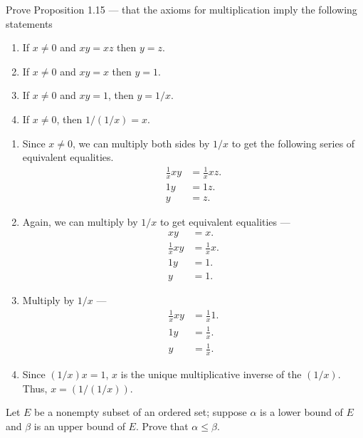 \documentclass[12 pt, letterpaper]{hmcpset}
\begin{document}
\pagebreak

\begin{problem}[3.]
	Prove Proposition 1.15 --- that the axioms for multiplication imply the following statements
	\begin{enumerate}
		\item If $x \neq 0$ and $xy = xz$ then $y = z$.
		\item If $x \neq 0$ and $xy = x$ then $y = 1$.
		\item If $x \neq 0$ and $xy = 1$, then $y = 1/x$.
		\item If $x \neq 0$, then $1/(1/x) = x$.
	\end{enumerate}
\end{problem}

\begin{solution}
	\begin{enumerate}
		\item Since $x \neq 0$, we can multiply both sides by $1/x$ to get the following series of equivalent equalities.
			\[
				\begin{split}
					\frac{1}{x} xy & = \frac{1}{x} xz. \\
					1y & = 1z. \\
					y & = z.
				\end{split}
			\]
		\item Again, we can multiply by $1/x$ to get equivalent equalities ---
			\[
				\begin{split}
					xy & = x. \\
					\frac{1}{x} xy & = \frac{1}{x} x. \\
					1 y & = 1. \\
					y & = 1.
				\end{split}
			\]
		\item Multiply by $1/x$ ---
			\[
				\begin{split}
					\frac{1}{x} xy & = \frac{1}{x} 1. \\
					1 y & = \frac{1}{x}. \\
					y & = \frac{1}{x}.
				\end{split}
			\]
		\item Since $(1/x) x = 1$, $x$ is the unique multiplicative inverse of the $(1/x)$. Thus, $x = (1/(1/x))$.
	\end{enumerate}
\end{solution}

\pagebreak

\begin{problem}[4.]
	Let $E$ be a nonempty subset of an ordered set; suppose $\alpha$ is a lower bound of $E$ and $\beta$ is an upper bound of $E$. Prove that $\alpha \le \beta$.
\end{problem}
\end{document}
